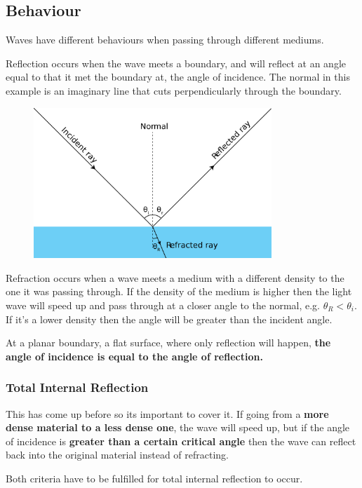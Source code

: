 \documentclass[11pt, titlepage]{article}
\begin{document}
\subsection{Behaviour}
Waves have different behaviours when passing through different mediums.

Reflection occurs when the wave meets a boundary, and will reflect at an angle equal to that it met the boundary at, the angle of incidence.  The normal in this example is an imaginary line that cuts perpendicularly through the boundary.

\begin{figure}[H]
\centering
\includegraphics[width=0.8\textwidth]{incidence-reflection}
\end{figure}

Refraction occurs when a wave meets a medium with a different density to the one it was passing through.  If the density of the medium is higher then the light wave will speed up and pass through at a closer angle to the normal, e.g. $\theta_R < \theta_i$.  If it's a lower density then the angle will be greater than the incident angle.

At a planar boundary, a flat surface, where only reflection will happen, \textbf{the angle of incidence is equal to the angle of reflection.}

\subsubsection*{Total Internal Reflection}
This has come up before so its important to cover it.  If going from a \textbf{more dense material to a less dense one}, the wave will speed up, but if the angle of incidence is \textbf{greater than a certain critical angle} then the wave can reflect back into the original material instead of refracting.

Both criteria have to be fulfilled for total internal reflection to occur. 
\end{document}
